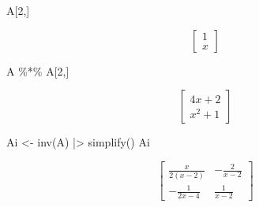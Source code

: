 \documentclass[
  ignorenonframetext,
]{beamer}
\newenvironment{Shaded}{\begin{snugshade}}{\end{snugshade}}
\newcommand{\DecValTok}[1]{\textcolor[rgb]{0.68,0.00,0.00}{#1}}
\newcommand{\FunctionTok}[1]{\textcolor[rgb]{0.28,0.35,0.67}{#1}}
\newcommand{\NormalTok}[1]{\textcolor[rgb]{0.00,0.23,0.31}{#1}}
\newcommand{\OtherTok}[1]{\textcolor[rgb]{0.00,0.23,0.31}{#1}}
\newcommand{\SpecialCharTok}[1]{\textcolor[rgb]{0.37,0.37,0.37}{#1}}
\begin{document}
\begin{frame}[fragile]
\begin{Shaded}
\begin{Highlighting}[]
\NormalTok{A[}\DecValTok{2}\NormalTok{,]}
\end{Highlighting}
\end{Shaded}

\[\left[\begin{matrix}1\\x\end{matrix}\right]\]

\begin{Shaded}
\begin{Highlighting}[]
\NormalTok{A }\SpecialCharTok{\%*\%}\NormalTok{ A[}\DecValTok{2}\NormalTok{,]}
\end{Highlighting}
\end{Shaded}

\[\left[\begin{matrix}4 x + 2\\x^{2} + 1\end{matrix}\right]\]

\begin{Shaded}
\begin{Highlighting}[]
\NormalTok{Ai  }\OtherTok{\textless{}{-}} \FunctionTok{inv}\NormalTok{(A) }\SpecialCharTok{|\textgreater{}} \FunctionTok{simplify}\NormalTok{() }
\NormalTok{Ai}
\end{Highlighting}
\end{Shaded}

\[\left[\begin{matrix}\frac{x}{2 \left(x - 2\right)} & - \frac{2}{x - 2}\\- \frac{1}{2 x - 4} & \frac{1}{x - 2}\end{matrix}\right]\]
\end{frame}
\end{document}
